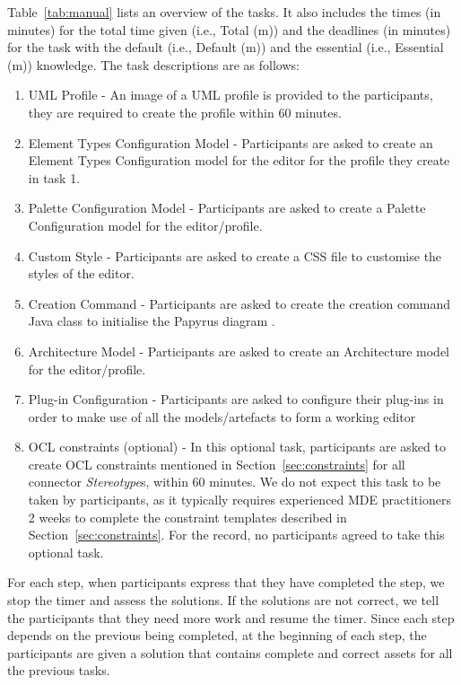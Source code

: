 Table~\ref{tab:manual} lists an overview of the tasks. It also includes the times (in minutes) for the total time given (i.e., Total (m))  and the deadlines (in minutes) for the task with the default (i.e., Default (m)) and the essential (i.e., Essential (m)) knowledge.
The task descriptions are as follows:
\begin{enumerate}
	\item UML Profile - An image of a UML profile is provided to the participants, they are required to create the profile within 60 minutes.
	\item Element Types Configuration Model - Participants are asked to create an Element Types Configuration model for the editor for the profile they create in task 1.
	\item Palette Configuration Model - Participants are asked to create a Palette Configuration model for the editor/profile.
	\item Custom Style - Participants are asked to create a CSS file to customise the styles of the editor.
	\item Creation Command - Participants are asked to create the creation command Java class to initialise the Papyrus diagram .
	\item Architecture Model - Participants are asked to create an Architecture model for the editor/profile.
	\item Plug-in Configuration - Participants are asked to configure their plug-ins in order to make use of all the models/artefacts to form a working editor
	\item OCL constraints (optional) - In this optional task, participants are asked to create OCL constraints mentioned in Section~\ref{sec:constraints} for all connector \textit{Stereotype}s, within 60 minutes. 
	We do not expect this task to be taken by participants, as it typically requires experienced MDE practitioners 2 weeks to complete the constraint templates described in Section~\ref{sec:constraints}.
	For the record, no participants agreed to take this optional task.
\end{enumerate}

For each step, when participants express that they have completed the step, we stop the timer and assess the solutions. 
If the solutions are not correct, we tell the participants that they need more work and resume the timer. 
Since each step depends on the previous being completed, at the beginning of each step, the participants are given a solution that contains complete and correct assets for all the previous tasks.

